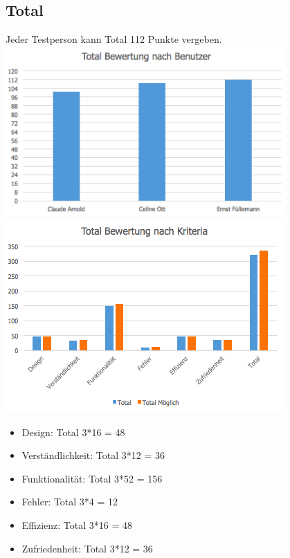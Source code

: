 \documentclass[a4,12pt]{scrartcl}
\begin{document}
\subsection{Total}
Jeder Testperson kann Total 112 Punkte vergeben. \\
\includegraphics[width=0.8\textwidth]{./pictures/total_user.png}\\
\includegraphics[width=0.8\textwidth]{./pictures/total_kriteria.png}
\begin{itemize}
\item Design: Total 3*16 = 48
\item Verständlichkeit: Total 3*12 = 36
\item Funktionalität: Total 3*52 = 156
\item Fehler: Total 3*4 = 12
\item Effizienz: Total 3*16 = 48
\item Zufriedenheit: Total 3*12 = 36
\end{itemize}
\end{document}
